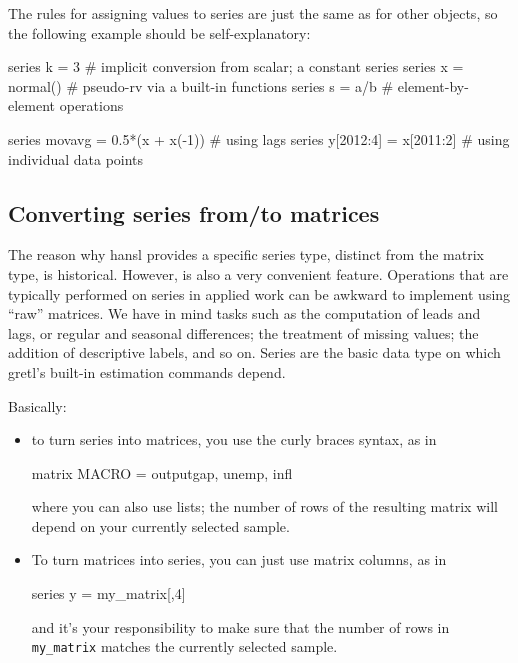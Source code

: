 The rules for assigning values to series are just the same as for
other objects, so the following example should be self-explanatory:
\begin{code}
  series k = 3         # implicit conversion from scalar; a constant series
  series x = normal()  # pseudo-rv via a built-in functions
  series s = a/b       # element-by-element operations

  series movavg = 0.5*(x + x(-1)) # using lags
  series y[2012:4] = x[2011:2]    # using individual data points 
\end{code}


\subsection{Converting series from/to matrices}

The reason why hansl provides a specific series type, distinct from
the matrix type, is historical. However, is also a very convenient
feature.  Operations that are typically performed on series in applied
work can be awkward to implement using ``raw'' matrices. We have in
mind tasks such as the computation of leads and lags, or regular and
seasonal differences; the treatment of missing values; the addition of
descriptive labels, and so on. Series are the basic data type on which
gretl's built-in estimation commands depend.

Basically:
\begin{itemize}
\item to turn series into matrices, you use the curly braces syntax,
  as in
  \begin{code}
    matrix MACRO = { outputgap, unemp, infl }
  \end{code}
  where you can also use lists; the number of rows of the resulting
  matrix will depend on your currently selected sample.
\item To turn matrices into series, you can just use matrix columns,
  as in
  \begin{code}
    series y = my_matrix[,4]
  \end{code}
  and it's your responsibility to make sure that the number of rows in
  \texttt{my\_matrix} matches the currently selected sample.
\end{itemize}

